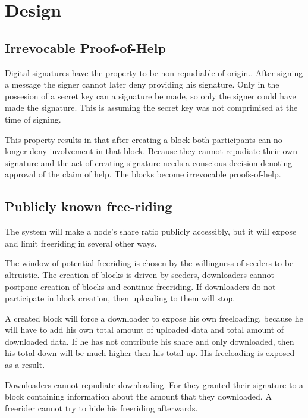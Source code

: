 \chapter{Design}

\section{Irrevocable Proof-of-Help}
Digital signatures have the property to be non-repudiable of origin.\cite{VanderLubbe-crypto}.
After signing a message the signer cannot later deny providing his signature.
Only in the possesion of a secret key can a signature be made,
so only the signer could have made the signature.
This is assuming the secret key was not comprimised at the time of signing.

This property results in that after creating a block
both participants can no longer deny involvement in that block.
Because they cannot repudiate their own signature
and the act of creating signature needs a conscious decision denoting approval of the claim of help.
The blocks become irrevocable proofs-of-help.

\section{Publicly known free-riding}
The system will make a node's share ratio publicly accessibly,
but it will expose and limit freeriding in several other ways.

The window of potential freeriding is chosen by the willingness of seeders to be altruistic.
The creation of blocks is driven by seeders,
downloaders cannot postpone creation of blocks and continue freeriding.
If downloaders do not participate in block creation,
then uploading to them will stop.

A created block will force a downloader to expose his own freeloading,
because he will have to add his own total amount of uploaded data and total amount of downloaded data.
If he has not contribute his share and only downloaded,
then his total down will be much higher then his total up.
His freeloading is exposed as a result.

Downloaders cannot repudiate downloading.
For they granted their signature to a block containing information about the amount that they downloaded.
A freerider cannot try to hide his freeriding afterwards.




